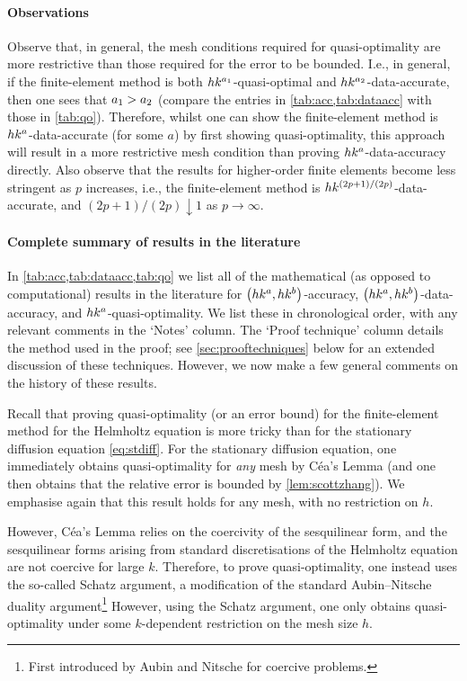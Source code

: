 \paragraph{Observations} Observe that, in general, the mesh conditions required for quasi-optimality are more restrictive than those required for the error to be bounded. I.e., in general, if the finite-element method is both $hk^{a_{1}}$-quasi-optimal and $hk^{a_{2}}$-data-accurate, then one sees that $a_{1} > a_{2}$ (compare the entries in \cref{tab:acc,tab:dataacc} with those in \cref{tab:qo}). Therefore, whilst one can show the finite-element method is $hk^{a}$-data-accurate (for some $a$) by first showing quasi-optimality, this approach will result in a more restrictive mesh condition than proving $hk^{a}$-data-accuracy directly. Also observe that the results for higher-order finite elements become less stringent as $p$ increases, i.e., the finite-element method is $hk^{(2p+1)/(2p)}$-data-accurate, and $(2p+1)/(2p) \downarrow 1$ as $p \rightarrow \infty.$

\paragraph{Complete summary of results in the literature} In \cref{tab:acc,tab:dataacc,tab:qo} we list all of the mathematical (as opposed to computational) results in the literature for $\hk{a}b$-accuracy, $\hk{a}b$-data-accuracy, and $hk^{a}$-quasi-optimality. We list these in chronological order, with any relevant comments in the `Notes' column. The `Proof technique' column details the method used in the proof; see \cref{sec:prooftechniques} below for an extended discussion of these techniques. However, we now make a few general comments on the history of these results.

Recall that proving quasi-optimality (or an error bound) for the finite-element method for the Helmholtz equation is more tricky than for the stationary diffusion equation \cref{eq:stdiff}. For the stationary diffusion equation, one immediately obtains quasi-optimality for \emph{any} mesh by C\'ea's Lemma (and one then obtains that the relative error is bounded by \cref{lem:scottzhang}). We emphasise again that this result holds for any mesh, with no restriction on $h.$

However, C\'ea's Lemma relies on the coercivity of the sesquilinear form, and the sesquilinear forms arising from standard discretisations of the Helmholtz equation are not coercive for large $k$. Therefore, to prove quasi-optimality, one instead uses the so-called Schatz argument, a modification of the standard Aubin--Nitsche duality argument\footnote{First introduced by Aubin \cite{Au:67} and Nitsche \cite{Ni:68} for coercive problems.} However, using the Schatz argument, one only obtains quasi-optimality under some $k$-dependent restriction on the mesh size $h.$

